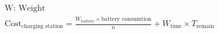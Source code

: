 \begin{equation}	
\label{eq:charging_station_cost}
\begin{aligned}
	& \mbox{W: Weight } \\
	& \mbox{Cost}_{\mbox{charging station}} = \frac{W_{\mbox{battery}} \times \mbox{battery consumtion}}{n} + W_{\mbox{time}} \times T_{\mbox{remain}}
\end{aligned}
\end{equation}

